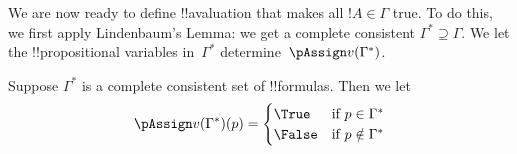 

\begin{explain}
We are now ready to define !!a{valuation}
  that makes all $!A \in \Gamma$ true. To do this, we first apply
  Lindenbaum's Lemma: we get a complete consistent $\Gamma^* \supseteq
  \Gamma$. We let the !!{propositional variable}s in~$\Gamma^*$
  determine~$\pAssign v(\Gamma^*)$.
\end{explain}


\begin{defn}
Suppose $\Gamma^*$ is a complete consistent set of !!{formula}s. Then we let
\[
\pAssign v(\Gamma^*)(p) = \begin{cases}
  \True & \text{if $p \in \Gamma^*$}\\
  \False & \text{if $p \notin \Gamma^*$}
  \end{cases}
\]
\end{defn}


